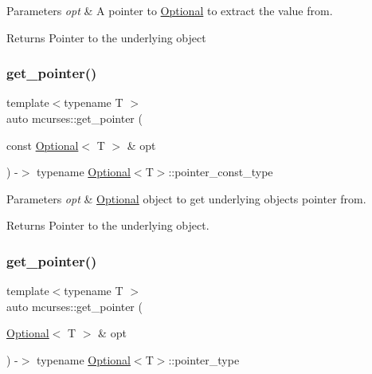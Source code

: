 \begin{DoxyParams}{Parameters}
{\em opt} & A pointer to \hyperlink{classmcurses_1_1Optional}{Optional} to extract the value from. \\
\hline
\end{DoxyParams}
\begin{DoxyReturn}{Returns}
Pointer to the underlying object 
\end{DoxyReturn}
\hypertarget{namespacemcurses_a3a37e772efc81d6dc80e6b53ffa8c89c}{}\label{namespacemcurses_a3a37e772efc81d6dc80e6b53ffa8c89c} 
\subsubsection{\texorpdfstring{get\+\_\+pointer()}{get\_pointer()}\hspace{0.1cm}{\footnotesize\ttfamily [1/2]}}
{\footnotesize\ttfamily template$<$typename T $>$ \\
auto mcurses\+::get\+\_\+pointer (\begin{DoxyParamCaption}\item[{const \hyperlink{classmcurses_1_1Optional}{Optional}$<$ T $>$ \&}]{opt }\end{DoxyParamCaption}) -\/$>$ typename \hyperlink{classmcurses_1_1Optional}{Optional}$<$T$>$\+::pointer\+\_\+const\+\_\+type }


\begin{DoxyParams}{Parameters}
{\em opt} & \hyperlink{classmcurses_1_1Optional}{Optional} object to get underlying object\textquotesingle{}s pointer from. \\
\hline
\end{DoxyParams}
\begin{DoxyReturn}{Returns}
Pointer to the underlying object. 
\end{DoxyReturn}
\hypertarget{namespacemcurses_a19b17f8de177c03a633c1b48fdf0a91c}{}\label{namespacemcurses_a19b17f8de177c03a633c1b48fdf0a91c} 
\subsubsection{\texorpdfstring{get\+\_\+pointer()}{get\_pointer()}\hspace{0.1cm}{\footnotesize\ttfamily [2/2]}}
{\footnotesize\ttfamily template$<$typename T $>$ \\
auto mcurses\+::get\+\_\+pointer (\begin{DoxyParamCaption}\item[{\hyperlink{classmcurses_1_1Optional}{Optional}$<$ T $>$ \&}]{opt }\end{DoxyParamCaption}) -\/$>$ typename \hyperlink{classmcurses_1_1Optional}{Optional}$<$T$>$\+::pointer\+\_\+type }


